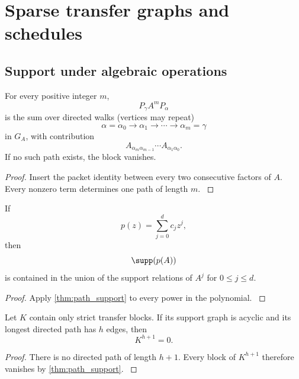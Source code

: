 \section{Sparse transfer graphs and schedules}\label{main:section:006}\label{sec:graphs}

\subsection{Support under algebraic operations}\label{main:subsection:005}

\begin{theorem}\label{main:theorem:014}\label{thm:path_support}
For every positive integer \(m\),
\[
P_\gamma A^mP_\alpha
\]
is the sum over directed walks (vertices may repeat)
\[
\alpha=\alpha_0
\longrightarrow
\alpha_1
\longrightarrow\cdots\longrightarrow
\alpha_m=\gamma
\]
in \(G_A\), with contribution
\[
A_{\alpha_m\alpha_{m-1}}
\cdots
A_{\alpha_1\alpha_0}.
\]
If no such path exists, the block vanishes.
\end{theorem}

\begin{proof}\label{main:proof:026}
Insert the packet identity between every two consecutive factors of \(A\). Every nonzero term determines one path of length \(m\).
\label{main:proof:026:end}\end{proof}

\begin{corollary}\label{main:corollary:008}\label{cor:polynomial_support}
If
\[
p(z)=\sum_{j=0}^dc_jz^j,
\]
then
\[
\supp(p(A))
\]
is contained in the union of the support relations of \(A^j\) for \(0\leq j\leq d\).
\end{corollary}

\begin{proof}\label{main:proof:027}
Apply \cref{thm:path_support} to every power in the polynomial.
\label{main:proof:027:end}\end{proof}

\begin{corollary}\label{main:corollary:009}\label{cor:acyclic_nilpotence}
Let \(K\) contain only strict transfer blocks. If its support graph is acyclic and its longest directed path has \(h\) edges, then
\[
K^{h+1}=0.
\]
\end{corollary}

\begin{proof}\label{main:proof:028}
There is no directed path of length \(h+1\). Every block of \(K^{h+1}\) therefore vanishes by \cref{thm:path_support}.
\label{main:proof:028:end}\end{proof}

